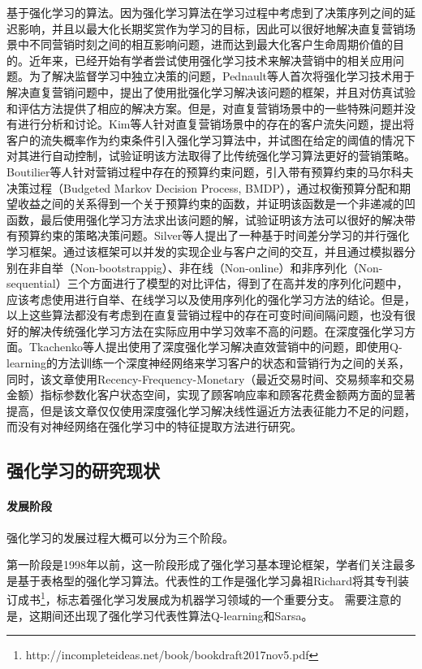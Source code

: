 基于强化学习的算法。因为强化学习算法在学习过程中考虑到了决策序列之间的延迟影响，并且以最大化长期奖赏作为学习的目标，因此可以很好地解决直复营销场景中不同营销时刻之间的相互影响问题，进而达到最大化客户生命周期价值的目的。近年来，已经开始有学者尝试使用强化学习技术来解决营销中的相关应用问题。为了解决监督学习中独立决策的问题，Pednault等人\citep{pednault2002sequential}首次将强化学习技术用于解决直复营销问题中，提出了使用批强化学习解决该问题的框架，并且对仿真试验和评估方法提供了相应的解决方案。但是，对直复营销场景中的一些特殊问题并没有进行分析和讨论。Kim等人\citep{kim2009new}针对直复营销场景中的存在的客户流失问题，提出将客户的流失概率作为约束条件引入强化学习算法中，并试图在给定的阈值的情况下对其进行自动控制，试验证明该方法取得了比传统强化学习算法更好的营销策略。Boutilier等人\citep{boutilier2016budget}针对营销过程中存在的预算约束问题，引入带有预算约束的马尔科夫决策过程（Budgeted Markov Decision Process, BMDP），通过权衡预算分配和期望收益之间的关系得到一个关于预算约束的函数，并证明该函数是一个非递减的凹函数，最后使用强化学习方法求出该问题的解，试验证明该方法可以很好的解决带有预算约束的策略决策问题。Silver等人\citep{silver2013concurrent}提出了一种基于时间差分学习的并行强化学习框架。通过该框架可以并发的实现企业与客户之间的交互，并且通过模拟器分别在非自举（Non-bootstrappig）、非在线（Non-online）和非序列化（Non-sequential）三个方面进行了模型的对比评估，得到了在高并发的序列化问题中，应该考虑使用进行自举、在线学习以及使用序列化的强化学习方法的结论。但是，以上这些算法都没有考虑到在直复营销过程中的存在可变时间间隔问题，也没有很好的解决传统强化学习方法在实际应用中学习效率不高的问题。在深度强化学习方面。Tkachenko等人\citep{tkachenko2015autonomous}提出使用了深度强化学习解决直效营销中的问题，即使用Q-learning的方法训练一个深度神经网络来学习客户的状态和营销行为之间的关系，同时，该文章使用Recency-Frequency-Monetary（最近交易时间、交易频率和交易金额）指标参数化客户状态空间，实现了顾客响应率和顾客花费金额两方面的显著提高，但是该文章仅仅使用深度强化学习解决线性逼近方法表征能力不足的问题，而没有对神经网络在强化学习中的特征提取方法进行研究。

\subsection{强化学习的研究现状}

\paragraph{发展阶段}
强化学习的发展过程大概可以分为三个阶段。

第一阶段是1998年以前，这一阶段形成了强化学习基本理论框架，学者们关注最多是基于表格型的强化学习算法。代表性的工作是强化学习鼻祖Richard将其专刊装订成书\footnote{http://incompleteideas.net/book/bookdraft2017nov5.pdf}，标志着强化学习发展成为机器学习领域的一个重要分支。
需要注意的是，这期间还出现了强化学习代表性算法Q-learning\citep{watkins1992q}和Sarsa\citep{rummery1994line}。

